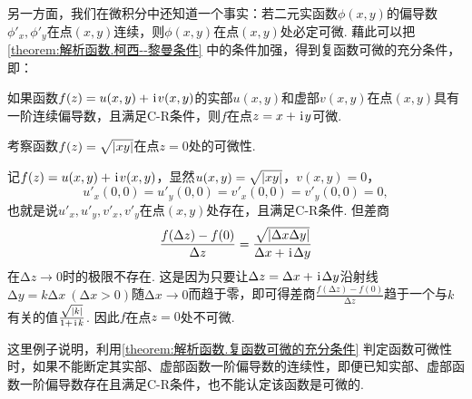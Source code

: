另一方面，我们在微积分中还知道一个事实：若二元实函数\(\phi(x,y)\)的偏导数\(\phi'_x,\phi'_y\)在点\((x,y)\)连续，则\(\phi(x,y)\)在点\((x,y)\)处必定可微.
藉此可以把\cref{theorem:解析函数.柯西--黎曼条件} 中的条件加强，得到复函数可微的充分条件，即：
\begin{theorem}\label{theorem:解析函数.复函数可微的充分条件}
如果函数\(f(z)=u(x,y)+\kern1pt\mathrm{i}\kern1pt v(x,y)\)的实部\(u(x,y)\)和虚部\(v(x,y)\)在点\((x,y)\)具有一阶连续偏导数，且满足C-R条件，则\(f\)在点\(z=x+\kern1pt\mathrm{i}\kern1pt y\)可微.
\end{theorem}

\begin{example}
考察函数\(f(z) = \sqrt{\abs{xy}}\)在点\(z = 0\)处的可微性.
\begin{solution}
记\(f(z) = u(x,y) + \kern1pt\mathrm{i}\kern1pt v(x,y)\)，显然\(u(x,y) = \sqrt{\abs{xy}}\)，\(v(x,y) = 0\)，\begin{equation*}
u'_x(0,0) = u'_y(0,0) = v'_x(0,0) = v'_y(0,0) = 0,
\end{equation*}也就是说\(u'_x,u'_y,v'_x,v'_y\)在点\((x,y)\)处存在，且满足C-R条件.
但差商\begin{equation*}
\frac{f(\Delta z) - f(0)}{\Delta z}
= \frac{ \sqrt{ \abs{ \Delta x \Delta y } } }{ \Delta x + \kern1pt\mathrm{i}\kern1pt \Delta y }
\end{equation*}在\(\increment z \to 0\)时的极限不存在.
这是因为只要让\(\Delta z = \Delta x + \kern1pt\mathrm{i}\kern1pt \Delta y\)沿射线\(\increment y = k \increment x \ (\increment x > 0)\)随\(\increment x \to 0\)而趋于零，即可得差商\(\frac{f(\increment z) - f(0)}{\increment z}\)趋于一个与\(k\)有关的值\(\frac{\sqrt{\abs{k}}}{1 + \kern1pt\mathrm{i}\kern1pt k}\).
因此\(f\)在点\(z = 0\)处不可微.
\end{solution}
这里例子说明，利用\cref{theorem:解析函数.复函数可微的充分条件} 判定函数可微性时，如果不能断定其实部、虚部函数一阶偏导数的连续性，即便已知实部、虚部函数一阶偏导数存在且满足C-R条件，也不能认定该函数是可微的.
\end{example}

